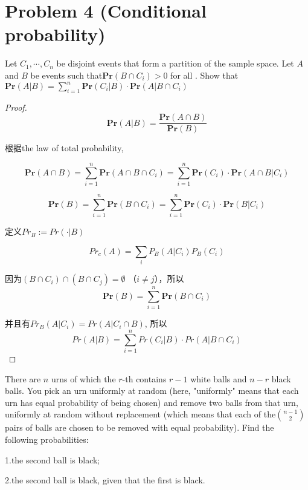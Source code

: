 \documentclass[12pt, a4paper, oneside]{ctexart}
\begin{document}
\newpage
\section*{Problem 4 (Conditional probability)}
\begin{problem}
 Let
$ C_1,\cdots, C_n $ be disjoint events that form a partition of the sample space. Let $A$
and $B$ be events such that$\textbf{Pr}(B\cap C_i)> 0 $
for all
. Show that $ \textbf{Pr}(A|B) = \sum_{i = 1}^n \textbf{Pr}(C_i|B)\cdot \textbf{Pr}(A|B\cap C_i) $


\end{problem}

\begin{proof}
  $$\textbf{Pr}(A|B) = \frac{\textbf{Pr}(A\cap B)}{\textbf{Pr}(B)}$$

  根据the law of total probability,

  $$\textbf{Pr}(A\cap B) = \sum_{i = 1}^n \textbf{Pr}(A\cap B\cap C_i) = \sum_{i = 1}^n \textbf{Pr}(C_i)\cdot \textbf{Pr}(A\cap B|C_i)$$

  $$\textbf{Pr}(B) = \sum_{i = 1}^n \textbf{Pr}(B\cap C_i) = \sum_{i = 1}^n \textbf{Pr}(C_i)\cdot \textbf{Pr}(B|C_i)$$






  定义$Pr_B := Pr(\cdot | B)$

  $$Pr_c(A) = \sum _i P_B(A|C_i)P_B(C_i)$$

  因为$(B\cap C_i) \cap (B\cap C_j) = \emptyset$ （$i\neq j$），所以
  $$ \textbf{Pr}(B) = \sum_{i=1}^n \textbf{Pr}(B\cap C_i) $$

  并且有$Pr_B(A|C_i)=Pr(A|C_i \cap B)$, 所以
  $$Pr(A|B)=\sum _{i=1}^n Pr(C_i|B)\cdot Pr(A|B \cap C_i)$$
\end{proof}
\begin{problem}
There are $n$
urns of which the
$r$-th contains $r-1$
white balls and $n-r$
black balls. You pick an urn uniformly at random (here, "uniformly" means that each urn has equal probability of being chosen) and remove two balls from that urn, uniformly at random without replacement (which means that each of the$\binom{n-1}{2}$
pairs of balls are chosen to be removed with equal probability). Find the following probabilities:

1.the second ball is black;

2.the second ball is black, given that the first is black.
\end{problem}
\end{document}
